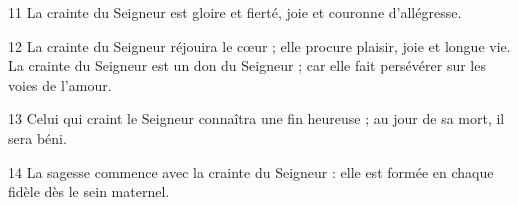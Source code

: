 
11 La crainte du Seigneur est gloire et fierté, joie et couronne d’allégresse.

12 La crainte du Seigneur réjouira le cœur ; elle procure plaisir, joie et longue vie. La crainte du Seigneur est un don du Seigneur ; car elle fait persévérer sur les voies de l’amour.

13 Celui qui craint le Seigneur connaîtra une fin heureuse ; au jour de sa mort, il sera béni.

14 La sagesse commence avec la crainte du Seigneur : elle est formée en chaque fidèle dès le sein maternel.